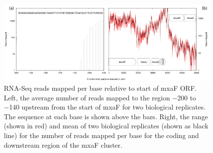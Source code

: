 \begin{figure}[H]
\centering
     \includegraphics[width=1.0\textwidth]{./tex/chapter1/figures/supplemental/FigureS3.png}
     \begin{singlespace}
     \caption[RNA-Seq reads mapped per base relative to start of mxaF ORF]{
        RNA-Seq reads mapped per base relative to start of mxaF ORF.
        Left, the average number of reads mapped to the region −200 to −140 upstream from the start of mxaF for two biological replicates.
        The sequence at each base is shown above the bars.
        Right, the range (shown in red) and mean of two biological replicates (shown as black line) for the number of reads mapped per base for the coding and downstream region of the mxaF cluster.
        }
     \label{fig:S3}
     \end{singlespace}
\end{figure}

